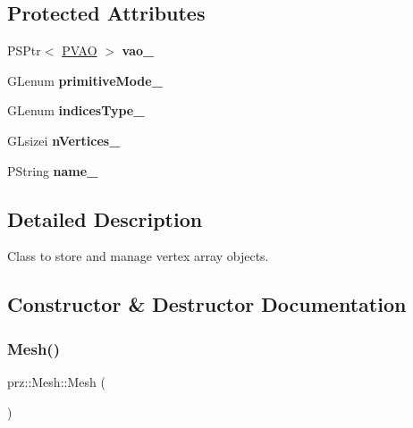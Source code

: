 \subsection*{Protected Attributes}
\begin{DoxyCompactItemize}
\item 
\mbox{\label{classprz_1_1_mesh_a378584eb11420ebdd6adac3389ccc565}} 
P\+S\+Ptr$<$ \mbox{\hyperlink{classprz_1_1_vertex___array___object}{P\+V\+AO}} $>$ {\bfseries vao\+\_\+}
\item 
\mbox{\label{classprz_1_1_mesh_a25867807a5fc38bb9fef4adc3054ad2f}} 
G\+Lenum {\bfseries primitive\+Mode\+\_\+}
\item 
\mbox{\label{classprz_1_1_mesh_ae10bca999da4d44c507a9b714eee7f77}} 
G\+Lenum {\bfseries indices\+Type\+\_\+}
\item 
\mbox{\label{classprz_1_1_mesh_ae99a348bf0c87fc7d75d45f646e657da}} 
G\+Lsizei {\bfseries n\+Vertices\+\_\+}
\item 
\mbox{\label{classprz_1_1_mesh_a148348983842e2200973c761290fbe6d}} 
P\+String {\bfseries name\+\_\+}
\end{DoxyCompactItemize}


\subsection{Detailed Description}
Class to store and manage vertex array objects. 



\subsection{Constructor \& Destructor Documentation}
\mbox{\label{classprz_1_1_mesh_a44ad0bce328a1dff4e02c394bb77566d}} 
\subsubsection{\texorpdfstring{Mesh()}{Mesh()}\hspace{0.1cm}{\footnotesize\ttfamily [1/4]}}
{\footnotesize\ttfamily prz\+::\+Mesh\+::\+Mesh (\begin{DoxyParamCaption}{ }\end{DoxyParamCaption})}



